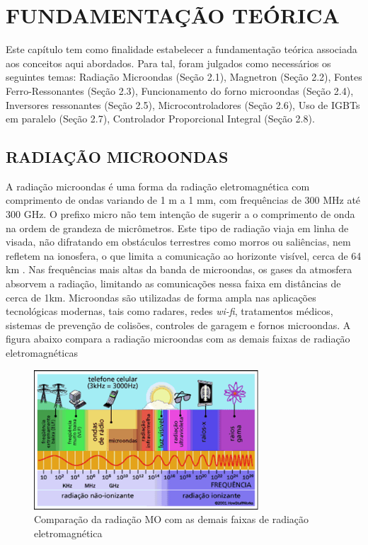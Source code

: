 
\chapter{FUNDAMENTAÇÃO TEÓRICA}
\label{chap:fundamentacaoTeorica}

Este capítulo tem como ﬁnalidade estabelecer a fundamentação teórica associada aos conceitos aqui abordados. Para tal, foram julgados como necessários os seguintes temas: Radiação Microondas (Seção 2.1), Magnetron (Seção 2.2), Fontes Ferro-Ressonantes (Seção 2.3), Funcionamento do forno microondas (Seção 2.4), Inversores ressonantes (Seção 2.5), Microcontroladores (Seção 2.6), Uso de IGBTs em paralelo (Seção 2.7), Controlador Proporcional Integral (Seção 2.8).

\section{RADIAÇÃO MICROONDAS}
\label{sec:radiacaoMicroondas}

A radiação microondas é uma forma da radiação eletromagnética com comprimento de ondas variando de 1 m a 1 mm, com frequências de 300 MHz até 300 GHz. O prefixo micro não tem intenção de sugerir a o comprimento de onda na ordem de grandeza de micrômetros. Este tipo de radiação viaja em linha de visada, não difratando em obstáculos terrestres como morros ou saliências, nem refletem na ionosfera, o que limita a comunicação ao horizonte visível, cerca de 64 km \cite{hitchcock}. Nas frequências mais altas da banda de microondas, os gases da atmosfera absorvem a radiação, limitando as comunicações nessa faixa em distâncias de cerca de 1km. Microondas são utilizadas de forma ampla nas aplicações tecnológicas modernas, tais como radares, redes \textit{wi-fi}, tratamentos médicos, sistemas de prevenção de colisões, controles de garagem e fornos microondas. A figura abaixo compara a radiação microondas com as demais faixas de radiação eletromagnéticas

\begin{figure}[!htb]
    \centering
    \includegraphics[width=0.75\textwidth]{./dados/figuras/figura_microondas}
    \caption{Comparação da radiação MO com as demais faixas de radiação eletromagnética}
    \label{fig:figura-mo}
\end{figure}

